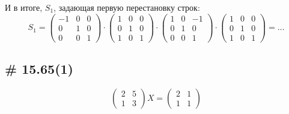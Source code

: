 \documentclass[a4paper,12pt]{article}
\begin{document}
\begin{solution}
    И в итоге, $S_1$, задающая первую перестановку строк:
    \[
      S_1 = \begin{pmatrix}
          -1 & 0 & 0\\
          0 & 1 & 0\\
          0 & 0 & 1
        \end{pmatrix}
      \cdot \begin{pmatrix}
          1 & 0 & 0\\
          0 & 1 & 0\\
          1 & 0 & 1
        \end{pmatrix}
      \cdot \begin{pmatrix}
          1 & 0 & -1\\
          0 & 1 & 0\\
          0 & 0 & 1
        \end{pmatrix}
      \cdot \begin{pmatrix}
          1 & 0 & 0\\
          0 & 1 & 0\\
          1 & 0 & 1
        \end{pmatrix}
      = \ldots
    \]
  \end{solution}
  
  
  \subsection{\# 15.65(1)}
  
  \[
    \begin{pmatrix}
      2 & 5\\
      1 & 3
    \end{pmatrix} X = \begin{pmatrix}
      2 & 1\\
      1 & 1
    \end{pmatrix}
  \]
  
\end{document}
